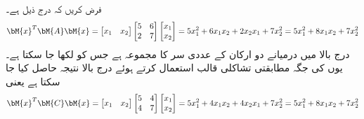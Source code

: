 فرض کریں کہ درج ذیل ہے۔
\begin{align*}
\bM{x}^T\bM{A}\bM{x}=\begin{bmatrix} x_1& x_2 \end{bmatrix}\begin{bmatrix} 5& 6\\2& 7\end{bmatrix}\begin{bmatrix}x_1\\x_2  \end{bmatrix}=5x_1^2+6x_1x_2+2x_2x_1+7x_2^2=5x_1^2+8x_1x_2+7x_2^2
\end{align*} 
درج بالا میں درمیانے دو ارکان کے عددی سر کا مجموعہ  ہے جس کو  لکھا جا سکتا ہے۔یوں  کی جگہ مطابقتی تشاکلی قالب  استعمال کرتے ہوئے درج بالا نتیجہ حاصل کیا جا سکتا ہے یعنی
\begin{align*}
\bM{x}^T\bM{C}\bM{x}=\begin{bmatrix} x_1& x_2 \end{bmatrix}\begin{bmatrix} 5& 4\\4& 7\end{bmatrix}\begin{bmatrix}x_1\\x_2  \end{bmatrix}=5x_1^2+4x_1x_2+4x_2x_1+7x_2^2=5x_1^2+8x_1x_2+7x_2^2
\end{align*} 

